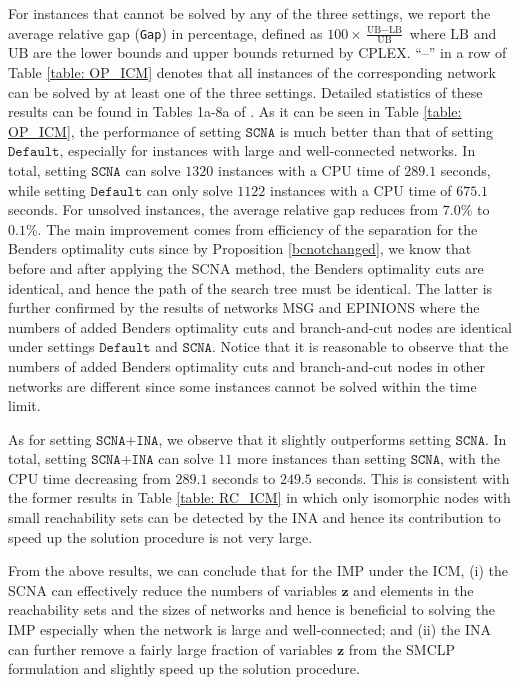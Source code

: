 \documentclass[a4paper,10pt]{article}
\theoremstyle{plain}
\newcommand{\revv}[1]{{#1}}
\newcommand{\Default}{{\texttt{Default}}\xspace}
\newcommand{\SCNA}{{\texttt{SCNA}}\xspace}
\newcommand{\INA}{{\texttt{SCNA+INA}}}
\newcommand{\Gap}{{\texttt{Gap}}\xspace}
\begin{document}
%
\revv{For instances that cannot be solved by any of the three settings, we report the average relative gap (\Gap) in percentage,
defined as $100 \times \frac{{\text{UB}}- {\text{LB}}}{{\text{UB}}}$ where $\text{LB}$ and $\text{UB}$ are the lower bounds and upper bounds returned by CPLEX. ``--'' in a row of Table \ref{table: OP_ICM} denotes that all instances of the corresponding network can be solved by at least one of the three settings.}
Detailed statistics of these results can be found in Tables 1a-8a of \cite{Chen2022}.
%
As it can be seen in Table \ref{table: OP_ICM}, the performance of setting $\SCNA$ is much better than that of setting $\Default$, especially for instances with large and  \revv{well-connected} networks.
%
In total, setting $\SCNA$ can solve $1320$ instances with a CPU time of $\revv{289.1}$ seconds,
while setting $\Default$ can only solve $1122$ instances with a CPU time of $\revv{675.1}$ seconds.
\revv{For unsolved instances, the average relative gap reduces from $7.0\%$ to $0.1\%$.}
\revv{The main improvement comes from efficiency of the separation for the Benders optimality cuts since by Proposition \ref{bcnotchanged}, we know that before and after applying the SCNA method, the Benders optimality cuts are identical, and hence the path of the search tree must  be identical.}
%
The latter is further confirmed by the results of networks MSG and EPINIONS where the numbers of added Benders \revv{optimality} cuts and \revv{branch-and-cut nodes} are identical under settings $\Default$ and $\SCNA$.
%
Notice that it is reasonable to observe that the numbers of added Benders \revv{optimality} cuts and \revv{branch-and-cut nodes} in other networks are different since some instances cannot be solved within the time limit.

As for setting $\INA$, we observe that \revv{it slightly outperforms setting $\SCNA$}.
%
In total, setting $\INA$ can solve $11$ more instances than setting $\SCNA$, with the CPU time decreasing from  $\revv{289.1}$  seconds to $\revv{249.5}$ seconds.
%
This is consistent with the former results in Table \ref{table: RC_ICM} in which only isomorphic nodes with small reachability sets can be detected by the INA and hence its contribution to speed up the solution procedure is not very large.

\revv{From the above results}, we can conclude that for the IMP under the ICM, (i) the SCNA can effectively reduce \revv{the numbers of variables $\boldsymbol{z}$ and elements in the reachability sets and} the sizes of networks and hence is beneficial to solving the IMP especially when the network is large and  \revv{well-connected}; and
(ii) \revv{the INA can further remove a fairly large fraction of variables $\boldsymbol{z}$ from the SMCLP formulation and slightly speed up the solution procedure}.
\end{document}
